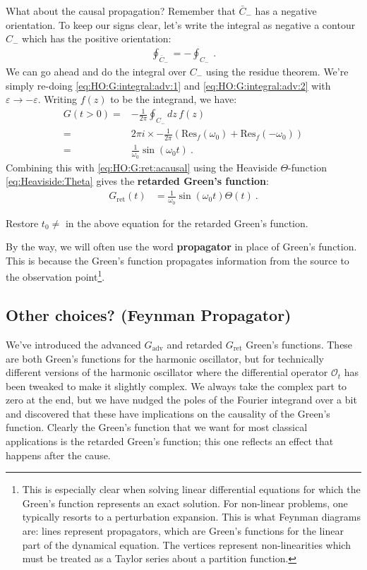 What about the causal propagation? Remember that $\bar C_{-}$ has a negative orientation. To keep our signs clear, let's write the integral as negative a contour $C_-$  which has the positive orientation: 
\begin{align}
	\oint_{\bar C_-} = -\oint_{C_-} \ .
\end{align}
We can go ahead and do the integral over $C_-$ using the residue theorem. We're simply re-doing \eqref{eq:HO:G:integral:adv:1} and \eqref{eq:HO:G:integral:adv:2} with $\varepsilon\to -\varepsilon$. Writing $f(z)$ to be the integrand, we have:
\begin{align}
	G(t>0) =& 
	-\frac{1}{2\pi} \oint_{C_-}dz\, f(z)
	\\
	=&
	2\pi i \times -\frac{1}{2\pi} 
	\left(\text{Res}_f(\omega_0) + \text{Res}_f(-\omega_0)\right)
	\\
	=& \frac{1}{\omega_0}\sin(\omega_0 t) \ .
\end{align}
Combining this with \eqref{eq:HO:G:ret:acausal} using the Heaviside $\Theta$-function \eqref{eq:Heaviside:Theta} gives the \textbf{retarded Green's function}:
\begin{align}
	G_\text{ret}(t) &= 
	\frac{1}{\omega_0}
	\sin(\omega_0 t)
	\Theta(t) \ .
	\label{eq:HO:Gret:sin:theta}
\end{align}
\begin{exercise}
Restore $t_0\neq$ in the above equation for the retarded Green's function.
\end{exercise}
By the way, we will often use the word \textbf{propagator} in place of Green's function. This is because the Green's function propagates information from the source to the observation point\footnote{This is especially clear when solving linear differential equations for which the Green's function represents an exact solution. For non-linear problems, one typically resorts to a perturbation expansion. This is what Feynman diagrams are: lines represent propagators, which are Green's functions for the linear part of the dynamical equation. The vertices represent non-linearities which must be treated as a Taylor series about a partition function.}. 


\subsection{Other choices? (Feynman Propagator)}

We've introduced the advanced $G_\text{adv}$ and retarded $G_\text{ret}$ Green's functions. These are both Green's functions for the harmonic oscillator, but for technically different versions of the harmonic oscillator where the differential operator $\mathcal O_t$ has been tweaked to make it slightly complex. We always take the complex part to zero at the end, but we have nudged the poles of the Fourier integrand over a bit and discovered that these have implications on the causality of the Green's function. Clearly the Green's function that we want for most classical applications is the retarded Green's function; this one reflects an effect that happens after the cause.

